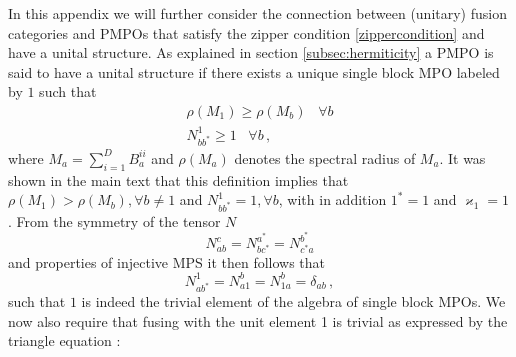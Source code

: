 \documentclass[12 pt]{article}
\begin{document}
In this appendix we will further consider the connection between (unitary) fusion categories and PMPOs that satisfy the zipper condition \eqref{zippercondition} and have a unital structure. As explained in section \ref{subsec:hermiticity} a PMPO is said to have a unital structure if there exists a unique single block MPO labeled by $1$ such that
\begin{eqnarray}
\rho(M_1) \geq \rho(M_b)\;\;\;\forall b\\
N^1_{bb^*} \geq 1\;\;\;\forall b\, ,
\end{eqnarray}
where $M_a = \sum_{i=1}^D B_a^{ii}$ and $\rho(M_a)$ denotes the spectral radius of $M_a$. It was shown in the main text that this definition implies that $\rho(M_1) > \rho(M_b), \forall b\neq 1$ and $N^1_{bb^*} = 1, \forall b$, with in addition $1^* = 1$ and $\varkappa_1 = 1$. From the symmetry of the tensor $N$
\begin{equation}
N^c_{ab} = N^{a^*}_{bc^*} = N_{c^*a}^{b^*}
\end{equation}
and properties of injective MPS it then follows that
\begin{equation}
N_{ab^*}^1 = N^b_{a1} = N^b_{1a} = \delta_{ab}\, ,
\end{equation}
such that $1$ is indeed the trivial element of the algebra of single block MPOs. We now also require that fusing with the unit element 1 is trivial as expressed by the triangle equation \cite{Kitaev06}:
\end{document}
